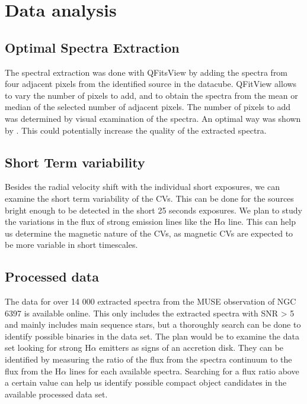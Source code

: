     
\section{Data analysis}

\subsection{Optimal Spectra Extraction}

The spectral extraction was done with QFitsView by adding the spectra from four adjacent pixels from the identified source in the datacube. QFitView allows to vary the number of pixels to add, and to obtain the spectra from the mean or median of the selected number of adjacent pixels. The number of pixels to add was determined by visual examination of the spectra. An optimal way was shown by \cite{horne_emission_1986}. This could potentially increase the quality of the extracted spectra. 

\subsection{Short Term variability}

Besides the radial velocity shift with the individual short exposures, we can examine the short term variability of the CVs. This can be done for the sources bright enough to be detected in the short 25 seconds exposures. We plan to study the variations in the flux of strong emission lines like the H$\alpha$ line. This can help us determine the magnetic nature of the CVs, as magnetic CVs are expected to be more variable in short timescales. %

\subsection{Processed data}

The data for over 14 000 extracted spectra from the MUSE observation of NGC 6397 is available online. This only includes the extracted spectra with SNR > 5 and mainly includes main sequence stars, but a thoroughly search can be done to identify possible binaries in the data set. The plan would be to examine the data set looking for strong H$\alpha$ emitters as signs of an accretion disk. They can be identified by measuring the ratio of the flux from the spectra continuum to the flux from the H$\alpha$ lines for each available spectra. Searching for a flux ratio above a certain value can help us identify possible compact object candidates in the available processed data set. 

